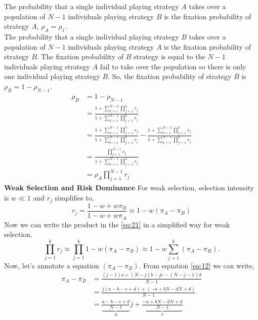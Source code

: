 \documentclass{article}
\begin{document}
The probability that a single individual playing strategy $A$ takes over a population of $N-1$ individuals playing strategy $B$ is the fixation probability of strategy $A$, $\rho_A=\rho_1$.\\
The probability that a single individual playing strategy $B$ takes over a population of $N-1$ individuals playing strategy $A$ is the fixation probability of strategy $B$. The fixation probability of $B$ strategy is equal to the $N-1$ individuals playing strategy $A$ fail to take over the population so there is only one individual playing strategy $B$. So, the fixation probability of strategy $B$ is $\rho_B= 1-\rho_{N-1}$.\citep{traulsen2009stochastic}
\begin{align}
\rho_B &=1-\rho_{N-1} \nonumber\\
&=\frac{1 + \sum_{k=1}^{N-2} \prod_{j=1}^{k} r_j}{1 + \sum_{k=1}^{N-1} \prod_{j=1}^{k} r_j} \nonumber\\
&= \frac{1 + \sum_{k=1}^{N-1} \prod_{j=1}^{k} r_j}{1 + \sum_{k=1}^{N-1} \prod_{j=1}^{k} r_j} - \frac{1 + \sum_{k=1}^{N-2} \prod_{j=1}^{k} r_j}{1 + \sum_{k=1}^{N-1} \prod_{j=1}^{k} r_j} \nonumber\\
&= \frac{\prod_{j=1}^{N-1} r_j}{1 + \sum_{k=1}^{N-1} \prod_{j=1}^{k} r_j} \nonumber \\
&= \rho_A \prod_{j=1}^{N-1} r_j \label{eq:23}
\end{align}
\textbf{Weak Selection and Risk Dominance}
\newline
For weak selection, selection intensity is $w\ll 1$ and $r_j$ simplifies to,
\begin{equation}
r_j = \frac{1-w+w\pi_B}{1-w+w\pi_A} \approx 1-w(\pi_A-\pi_B) \label{eq:24}
\end{equation}
Now we can write the product in the \eqref{eq:21} in a simplified way for weak selection.
\begin{equation}
\prod_{j=1}^k r_j \approx \prod_{j=1}^k 1-w(\pi_A-\pi_B) \approx 1-w \sum_{j=1}^k (\pi_A-\pi_B). \label{eq:25}
\end{equation}
Now, let's annotate a equation $(\pi_A-\pi_B)$.
From equation \eqref{eq:12} we can write,
\begin{align}
\pi_A - \pi_B &= \frac{(j - 1)a + (N - j)b - jc - (N - j - 1)d}{N - 1} \nonumber\\
&= \frac{j(a - b - c + d) + (-a + bN - dN + d)}{N - 1}\nonumber\\
&= \underbrace{\frac{a - b - c + d}{N - 1}}_{u} j 
+ \underbrace{\frac{-a + bN - dN + d}{N - 1}}_{v} \label{eq:26}
\end{align}
\end{document}
